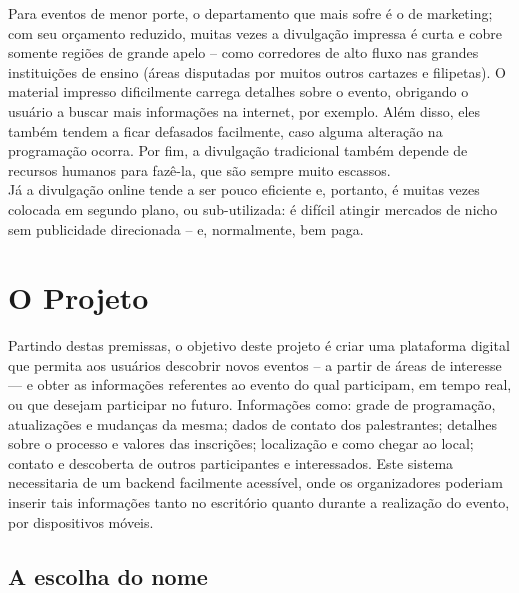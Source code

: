 \documentclass[12pt,a4paper,twoside,hyphens,english,brazil]{abntex2}
\begin{document}
Para eventos de menor porte, o departamento que mais sofre é o de marketing; com seu orçamento reduzido, muitas vezes a divulgação impressa é curta e cobre somente regiões de grande apelo -- como corredores de alto fluxo nas grandes instituições de ensino (áreas disputadas por muitos outros cartazes e filipetas). O material impresso dificilmente carrega detalhes sobre o evento, obrigando o usuário a buscar mais informações na internet, por exemplo. Além disso, eles também tendem a ficar defasados facilmente, caso alguma alteração na programação ocorra. Por fim, a divulgação tradicional também depende de recursos humanos para fazê-la, que são sempre muito escassos.\\
Já a divulgação online tende a ser pouco eficiente e, portanto, é muitas vezes colocada em segundo plano, ou sub-utilizada: é difícil atingir mercados de nicho sem publicidade direcionada -- e, normalmente, bem paga.

\section{O Projeto}

Partindo destas premissas, o objetivo deste projeto é criar uma plataforma digital que permita aos usuários descobrir novos eventos -- a partir de áreas de interesse --- e obter as informações referentes ao evento do qual participam, em tempo real, ou que desejam participar no futuro. Informações como: grade de programação, atualizações e mudanças da mesma; dados de contato dos palestrantes; detalhes sobre o processo e valores das inscrições; localização e como chegar ao local; contato e descoberta de outros participantes e interessados. Este sistema necessitaria de um backend facilmente acessível, onde os organizadores poderiam inserir tais informações tanto no escritório quanto durante a realização do evento, por dispositivos móveis.



\subsection{A escolha do nome}
\end{document}
